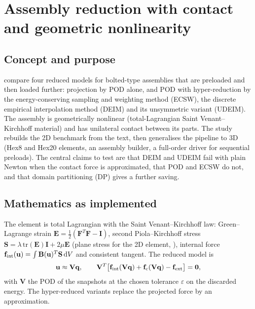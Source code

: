 \section{Assembly reduction with contact and geometric nonlinearity}\label{sec:vf-asm}

\subsection*{Concept and purpose}

\citet{nikiema2026assembly} compare four reduced models for bolted-type assemblies that are preloaded and then loaded further: projection by POD alone, and POD with hyper-reduction by the energy-conserving sampling and weighting method (ECSW), the discrete empirical interpolation method (DEIM) and its unsymmetric variant (UDEIM). The assembly is geometrically nonlinear (total-Lagrangian Saint Venant--Kirchhoff material) and has unilateral contact between its parts. The study rebuilds the 2D benchmark from the text, then generalises the pipeline to 3D (Hex8 and Hex20 elements, an assembly builder, a full-order driver for sequential preloads). The central claims to test are that DEIM and UDEIM fail with plain Newton when the contact force is approximated, that POD and ECSW do not, and that domain partitioning (DP) gives a further saving.

\subsection*{Mathematics as implemented}

The element is total Lagrangian with the Saint Venant--Kirchhoff law: Green--Lagrange strain $\mathbf E=\tfrac12(\mathbf F^{T}\mathbf F-\mathbf I)$, second Piola--Kirchhoff stress $\mathbf S=\lambda\,\mathrm{tr}(\mathbf E)\mathbf I+2\mu\mathbf E$ (plane stress for the 2D element, ), internal force $\mathbf f_{\rm int}(\mathbf u)=\int\mathbf B(\mathbf u)^{T}\mathbf S\,\mathrm dV$ and consistent tangent. The reduced model is
\begin{equation}\label{eq:as-pod}
\mathbf u\approx\mathbf V\mathbf q,\qquad\mathbf V^{T}\bigl[\mathbf f_{\rm int}(\mathbf V\mathbf q)+\mathbf f_{\rm c}(\mathbf V\mathbf q)-\mathbf f_{\rm ext}\bigr]=\mathbf 0,
\end{equation}
with $\mathbf V$ the POD of the snapshots at the chosen tolerance $\varepsilon$ on the discarded energy. The hyper-reduced variants replace the projected force by an approximation.

